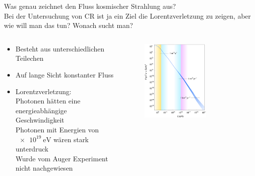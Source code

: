  \begin{frame}{Was genau zeichnet den Fluss kosmischer Strahlung aus?\\
  Bei der Untersuchung von CR ist ja ein Ziel die Lorentzverletzung zu
  zeigen, aber wie will man das tun? Wonach sucht man?}
    \begin{columns}
   \begin{column}{0.5\textwidth}
    \begin{itemize}
      \setlength\itemsep{2em}
      \item Besteht aus unterschiedlichen Teilechen
      \item Auf lange Sicht konstanter Fluss
      \item Lorentzverletzung:\\[1em]
      Photonen hätten eine energieabhängige Geschwindigkeit\\[1em]
      Photonen mit Energien von $\SI{e19}{\electronvolt}$ wären stark unterdruck\\[1em]
      Wurde vom Auger Experiment nicht nachgewiesen
     \end{itemize}
  \vspace{2em}
  \end{column}
  \begin{column}{0.5\textwidth}
  \begin{figure}
    \centering
    \includegraphics[width=0.7\textwidth]{images/cr.png}
  \end{figure}
  \end{column}
    \end{columns}
  \end{frame}

